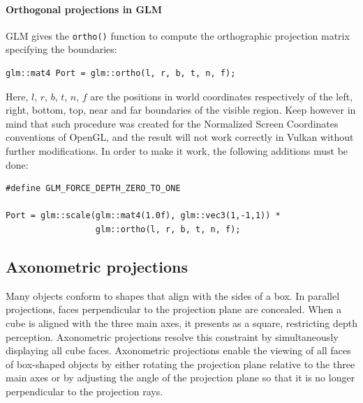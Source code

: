 \paragraph*{Orthogonal projections in GLM}
GLM gives the \texttt{ortho()} function to compute the orthographic projection matrix specifying the boundaries:
\begin{verbatim}
glm::mat4 Port = glm::ortho(l, r, b, t, n, f);
\end{verbatim}
Here, $l$, $r$, $b$, $t$, $n$, $f$ are the positions in world coordinates respectively of the left, right, bottom, top, near and far boundaries of the visible region.
Keep however in mind that such procedure was created for the Normalized Screen Coordinates conventions of OpenGL, and the result will not work correctly in Vulkan without further modifications.
In order to make it work, the following additions must be done: 
\begin{verbatim}
#define GLM_FORCE_DEPTH_ZERO_TO_ONE    

Port = glm::scale(glm::mat4(1.0f), glm::vec3(1,-1,1)) * 
                  glm::ortho(l, r, b, t, n, f);
\end{verbatim}

\subsection{Axonometric projections}
Many objects conform to shapes that align with the sides of a box. 
In parallel projections, faces perpendicular to the projection plane are concealed. When a cube is aligned with the three main axes, it presents as a square, restricting depth perception. 
Axonometric projections resolve this constraint by simultaneously displaying all cube faces.
Axonometric projections enable the viewing of all faces of box-shaped objects by either rotating the projection plane relative to the three main axes or by adjusting the angle of the projection plane so that it is no longer perpendicular to the projection rays.

